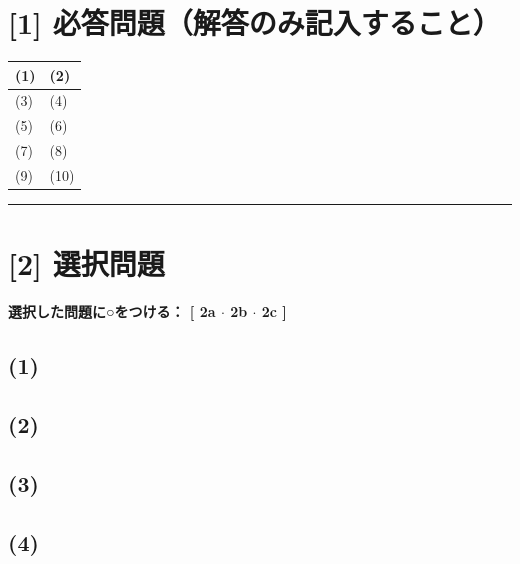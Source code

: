 \documentclass[11pt]{jlreq}
\begin{document}
\thispagestyle{fancy}


\section*{[1] 必答問題（解答のみ記入すること）}

\begin{tabular}{|p{}|p{}|}
\hline
(1) & (2) \\ [5ex] \hline
(3) & (4) \\ [5ex] \hline
(5) & (6) \\ [5ex] \hline
(7) & (8) \\ [5ex] \hline
(9) & (10) \\ [5ex] \hline
\end{tabular}

\vspace{2em}

\hrule

\vspace{2em}

\section*{[2] 選択問題}

\noindent

\textbf{選択した問題に○をつける： [ \quad 2a \quad $\cdot$ \quad 2b \quad $\cdot$ \quad 2c \quad ]} \\

\subsection*{(1)}

\vfill

\newpage

\subsection*{(2)}

\vfill

\newpage

\thispagestyle{fancy}



\subsection*{(3)}

\vfill

\newpage

\subsection*{(4)}

\vfill

\newpage
\end{document}
